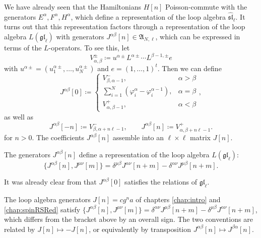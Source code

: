 We have already seen that the Hamiltonians $H[n]$ Poisson-commute with the generators $E^\alpha,F^\alpha,H^\alpha$, which define a representation of the loop algebra $\widehat{\mathfrak{sl}}_\ell$. It turns out that this representation factors through a representation of the loop algebra $L(\mathfrak{gl}_\ell)$ with generators $J^{\alpha\beta}[n] \in \mathfrak{A}_{N,\ell}$, which can be expressed in terms of the $L$-operators. To see this, let
\begin{equation}
    V_{\alpha,\beta}^\pm \coloneq u^{\alpha\pm} L^{\alpha\pm} \cdots L^{\beta-1,\pm} e
\end{equation}
with $u^{\alpha\pm} = (u_1^{\alpha\pm},\dots,u_N^{\alpha\pm})$ and $e = (1,\dots,1)^t$. Then we can define
\begin{equation}
    J^{\alpha\beta}[0] \coloneq
    \begin{cases}
        V_{\beta,\alpha-1}^-, & \alpha > \beta \\
        \sum_{i=1}^N (\varphi_i^\alpha - \varphi_i^{\alpha-1}), & \alpha = \beta \\
        V_{\alpha,\beta-1}^+, & \alpha < \beta
    \end{cases},
\end{equation}
as well as
\begin{equation}
    J^{\alpha\beta}[-n] \coloneq V_{\beta,\alpha+n\ell-1}^-, \qquad J^{\alpha\beta}[n] \coloneq V_{\alpha,\beta+n\ell-1}^+.
\end{equation}
for $n > 0$. The coefficients $J^{\alpha\beta}[n]$ assemble into an $\ell \times \ell$ matrix $J[n]$.

\begin{prop}
    The generators $J^{\alpha\beta}[n]$ define a representation of the loop algebra $L(\mathfrak{gl}_\ell)$:
    \begin{equation}
        \{ J^{\alpha\beta}[n],J^{\mu\nu}[m] \} = \delta^{\mu\beta} J^{\alpha\nu}[n+m] - \delta^{\alpha\nu} J^{\mu\beta}[n+m].
\end{equation}
\end{prop}

\begin{remark}
    It was already clear from \cite[\S 6.6]{bullimore_coulomb_2015} that $J^{\alpha\beta}[0]$ satisfies the relations of $\mathfrak{gl}_\ell$.
\end{remark}

\begin{remark}
    The loop algebra generators $J[n] = c g^n a$ of chapters \ref{chap:intro} and \ref{chap:spinRSRed} satisfy $\{ J^{\alpha\beta}[n],J^{\mu\nu}[m] \} = \delta^{\alpha\nu} J^{\mu\beta}[n+m] - \delta^{\mu\beta} J^{\alpha\nu}[n+m]$, which differs from the bracket above by an overall sign. The two conventions are related by $J[n] \mapsto -J[n]$, or equivalently by transposition $J^{\alpha\beta}[n] \mapsto J^{\beta\alpha}[n]$.
\end{remark}

